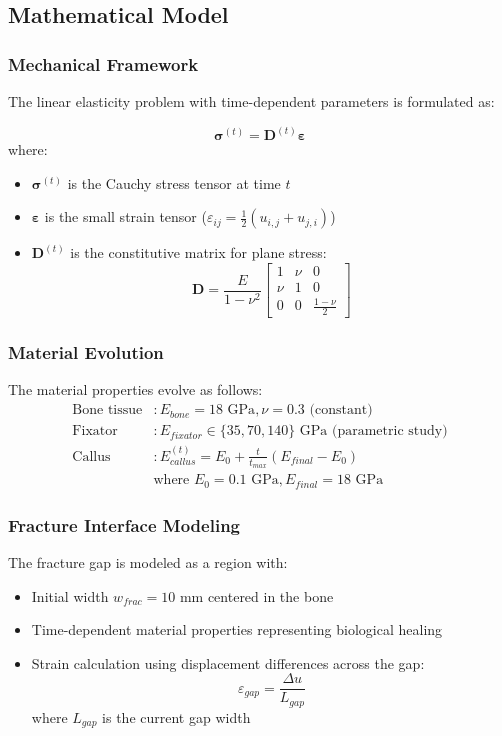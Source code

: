 \documentclass{article}
\begin{document}
\subsection{Mathematical Model}

\subsubsection{Mechanical Framework}

The linear elasticity problem with time-dependent parameters is formulated as:

\[
\bm{\sigma}^{(t)} = \mathbf{D}^{(t)}\bm{\varepsilon}
\]
where:
\begin{itemize}
  \item $\bm{\sigma}^{(t)}$ is the Cauchy stress tensor at time $t$
  \item $\bm{\varepsilon}$ is the small strain tensor ($\varepsilon_{ij} = \frac{1}{2}(u_{i,j} + u_{j,i})$)
  \item $\mathbf{D}^{(t)}$ is the constitutive matrix for plane stress:
  \[
  \mathbf{D} = \frac{E}{1-\nu^2}\begin{bmatrix}
  1 & \nu & 0 \\
  \nu & 1 & 0 \\
  0 & 0 & \frac{1-\nu}{2}
  \end{bmatrix}
  \]
\end{itemize}

\subsubsection{Material Evolution}
The material properties evolve as follows:
\begin{align*}
  \text{Bone tissue} & : E_{bone} = 18 \text{ GPa}, \nu = 0.3 \text{ (constant)} \\
  \text{Fixator}     & : E_{fixator} \in \{35, 70, 140\} \text{ GPa (parametric study)} \\
  \text{Callus}      & : E_{callus}^{(t)} = E_0 + \frac{t}{t_{max}}(E_{final}-E_0) \\
                     & \text{where } E_0 = 0.1 \text{ GPa}, E_{final} = 18 \text{ GPa}
\end{align*}

\subsubsection{Fracture Interface Modeling}
The fracture gap is modeled as a region with:
\begin{itemize}
  \item Initial width $w_{frac} = 10$ mm centered in the bone
  \item Time-dependent material properties representing biological healing
  \item Strain calculation using displacement differences across the gap:
  \[
  \varepsilon_{gap} = \frac{\Delta u}{L_{gap}}
  \]
  where $L_{gap}$ is the current gap width
\end{itemize}
\end{document}
